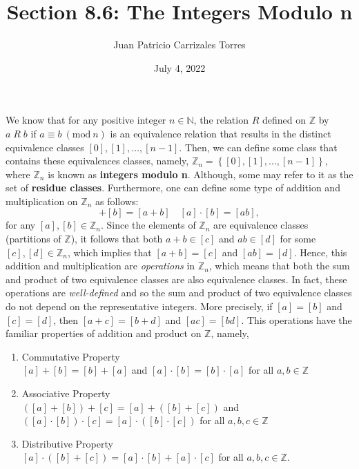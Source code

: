 \documentclass[12pt]{article}
\newcommand{\N}{\mathbb{N}}
\newcommand{\Z}{\mathbb{Z}}
\newcommand{\Mod}[1]{\ (\mathrm{mod}\ #1)}
\begin{document}
  
 \title{Section 8.6: The Integers Modulo n}
  \author{Juan Patricio Carrizales Torres}
   \date{July 4, 2022}
     \maketitle
	
     We know that for any positive integer $n\in \N$, the relation $R$ defined on $\Z$ by $a\; R\; b$ if $a\equiv b \Mod n$ is an equivalence relation that results in the distinct equivalence classes $[0],[1],\dots,[n-1]$. Then, we can define some class that contains these equivalences classes, namely, $\Z_{n} = \left\{ [0],[1],\dots,[n-1] \right\}$, where $\Z_{n}$ is known as \textbf{integers modulo n}. Although, some may refer to it as the set of \textbf{residue classes}.
     Furthermore, one can define some type of addition and multiplication on $\Z_{n}$ as follows:
     \begin{equation*}
       [a]+[b] = [a+b] \quad [a]\cdot[b] = [ab],
     \end{equation*}
	for any $[a],[b]\in \Z_{n}$. Since the elements of $\Z_{n}$ are equivalence classes (partitions of $\Z$), it follows that both $a+b\in [c]$ and $ab\in [d]$ for some $[c],[d]\in\Z_{n}$, which implies that $[a+b]=[c]$ and $[ab]=[d]$. Hence, this addition and multiplication are \textit{operations} in $\Z_{n}$, which means that both the sum and product of two equivalence classes are also equivalence classes. In fact, these operations are \textit{well-defined} and so the sum and product of two equivalence classes do not depend on the representative integers. More precisely, if $[a]=[b]$ and $[c]=[d]$, then $[a+c] = [b+d]$ and $[ac]=[bd]$.
	This operations have the familiar properties of addition and product on $\Z$, namely, 
	\begin{enumerate}[label=(\alph*)]
	  \item Commutative Property\\
	  $[a]+[b]=[b]+[a]$ and $[a]\cdot[b] = [b]\cdot[a]$ for all $a,b\in \Z$\\

	\item Associative Property\\
	  $([a]+[b])+[c] = [a] + ([b]+[c])$ and $([a]\cdot[b])\cdot[c] = [a]\cdot([b]\cdot[c])$ for all $a,b,c\in \Z$\\

	\item Distributive Property\\
	  $[a]\cdot([b]+[c]) = [a]\cdot[b]+[a]\cdot[c]$ for all $a,b,c\in \Z$.
	\end{enumerate}
\end{document}
